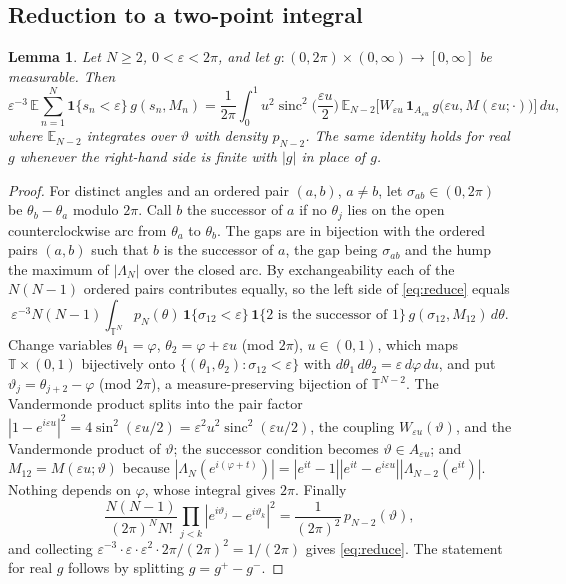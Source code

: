 \documentclass[12pt]{amsart}
\newtheorem{lemma}{Lemma}
\theoremstyle{remark}
\newcommand{\E}{\mathbb{E}}
\newcommand{\eps}{\varepsilon}
\newcommand{\T}{\mathbb{T}}
\newcommand{\1}{\mathbf{1}}
\newcommand{\sinc}{\operatorname{sinc}}
\begin{document}
\subsection{Reduction to a two-point integral}

\begin{lemma}\label{lem:reduce}
Let $N\ge2$, $0<\eps<2\pi$, and let $g:(0,2\pi)\times(0,\infty)\to[0,\infty]$
be measurable. Then
\begin{equation}\label{eq:reduce}
\eps^{-3}\,\E\sum_{n=1}^N\1\{s_n<\eps\}\,g(s_n,M_n)
=\frac1{2\pi}\int_0^1u^2\sinc^2\Big(\frac{\eps u}2\Big)\,
\E_{N-2}\Big[W_{\eps u}\,\1_{A_{\eps u}}\,g\big(\eps u,M(\eps u;\cdot)\big)\Big]\,du ,
\end{equation}
where $\E_{N-2}$ integrates over $\vartheta$ with density $p_{N-2}$. The
same identity holds for real $g$ whenever the right-hand side is finite
with $|g|$ in place of $g$.
\end{lemma}

\begin{proof}
For distinct angles and an ordered pair $(a,b)$, $a\ne b$, let
$\sigma_{ab}\in(0,2\pi)$ be $\theta_b-\theta_a$ modulo $2\pi$. Call $b$ the
successor of $a$ if no $\theta_j$ lies on the open counterclockwise arc
from $\theta_a$ to $\theta_b$. The gaps are in bijection with the ordered
pairs $(a,b)$ such that $b$ is the successor of $a$, the gap being
$\sigma_{ab}$ and the hump the maximum of $|\Lambda_N|$ over the closed arc.
By exchangeability each of the $N(N-1)$ ordered pairs contributes equally,
so the left side of \eqref{eq:reduce} equals
\[
\eps^{-3}N(N-1)\int_{\T^N}p_N(\theta)\,\1\{\sigma_{12}<\eps\}\,
\1\{2\text{ is the successor of }1\}\,g(\sigma_{12},M_{12})\,d\theta .
\]
Change variables $\theta_1=\varphi$, $\theta_2=\varphi+\eps u$ (mod $2\pi$),
$u\in(0,1)$, which maps $\T\times(0,1)$ bijectively onto
$\{(\theta_1,\theta_2):\sigma_{12}<\eps\}$ with
$d\theta_1\,d\theta_2=\eps\,d\varphi\,du$, and put
$\vartheta_j=\theta_{j+2}-\varphi$ (mod $2\pi$), a measure-preserving
bijection of $\T^{N-2}$. The Vandermonde product splits into the pair
factor $|1-e^{i\eps u}|^2=4\sin^2(\eps u/2)=\eps^2u^2\sinc^2(\eps u/2)$, the
coupling $W_{\eps u}(\vartheta)$, and the Vandermonde product of
$\vartheta$; the successor condition becomes $\vartheta\in A_{\eps u}$; and
$M_{12}=M(\eps u;\vartheta)$ because
$|\Lambda_N(e^{i(\varphi+t)})|=|e^{it}-1||e^{it}-e^{i\eps u}||\Lambda_{N-2}(e^{it})|$.
Nothing depends on $\varphi$, whose integral gives $2\pi$. Finally
\[
\frac{N(N-1)}{(2\pi)^NN!}\prod_{j<k}|e^{i\vartheta_j}-e^{i\vartheta_k}|^2
=\frac{1}{(2\pi)^2}\,p_{N-2}(\vartheta),
\]
and collecting $\eps^{-3}\cdot\eps\cdot\eps^2\cdot2\pi/(2\pi)^2=1/(2\pi)$
gives \eqref{eq:reduce}. The statement for real $g$ follows by splitting
$g=g^+-g^-$.
\end{proof}
\end{document}
